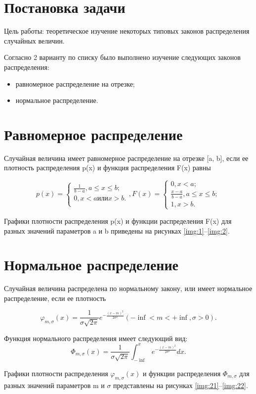 \documentclass[a4paper, 14pt, unknownkeysallowed]{extreport}
\begin{document}

\setcounter{page}{2}

\chapter{Постановка задачи}
Цель работы: теоретическое изучение некоторых типовых законов распределения случайных величин.

Согласно 2 варианту по списку было выполнено изучение следующих законов распределения:
\begin{itemize}
	\item равномерное распределение на отрезке;
	\item нормальное распределение.
\end{itemize}


\chapter{Равномерное распределение}

Случайная величина имеет равномерное распределение на отрезке [a, b], если ее плотность распределения p(x) и функция распределения F(x) равны

\begin{equation}
	p(x) = \begin{cases}
		\frac{1}{b - a}, a\leq x\leq b;\\
		0, x < a или x > b.\\
	\end{cases},   
	F(x) =  \begin{cases}
		0, x < a;\\
		\frac{x-a}{b-a}, a\leq x\leq b;\\
		1, x > b.
	\end{cases}
\end{equation}

Графики плотности распределения p(x) и функции распределения F(x) для разных значений параметров a и b приведены на рисунках \ref{img:1}--\ref{img:2}.


\chapter{Нормальное распределение}

Случайная величина распределена по нормальному закону, или имеет нормальное распределение, если ее плотность

\begin{equation}
	\varphi_{m,\sigma}(x) = \frac{1}{\sigma \sqrt{2\pi}} e^{-\frac{(x-m)^2}{2\sigma^2}} (-\inf<m<+\inf, \sigma > 0).
\end{equation}

Функция нормального распределения имеет следующий вид:
\begin{equation}
	\Phi_{m, \sigma}(x) = \frac{1}{\sigma \sqrt{2\pi}} \int_{-\inf}^{x} e^{-\frac{(x-m)^2}{2\sigma^2}} dx.
\end{equation}

Графики плотности распределения $\varphi_{m,\sigma}(x)$ и функции распределения $\Phi_{m, \sigma}$ для разных значений параметров m и $\sigma$ представлены на рисунках \ref{img:21}--\ref{img:22}.
\end{document}
